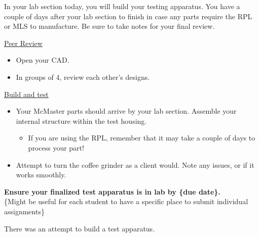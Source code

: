 \documentclass[11pt,letterpaper]{article}
\begin{document}
\MakeHandoutHeader

In your lab section today, you will build your testing apparatus. You have a couple of days after your lab section to finish in case any parts require the RPL or MLS to manufacture. Be sure to take notes for your final review.

\begin{AssignmentSteps}
  \item \underline{Peer Review}
    \begin{itemize}
      \item Open your CAD.
      \item In groups of 4, review each other's designs.
    \end{itemize}
  \item \underline{Build and test}
    \begin{itemize}
      \item Your McMaster parts should arrive by your lab section. Assemble your internal structure within the test housing.
        \begin{itemize}
          \item If you are using the RPL, remember that it may take a couple of days to process your part!
        \end{itemize}
      \item Attempt to turn the coffee grinder as a client would. Note any issues, or if it works smoothly.
    \end{itemize}
\end{AssignmentSteps}
\textbf{Ensure your finalized test apparatus is in lab by \{due date\}.}\\
\{Might be useful for each student to have a specific place to submit individual assignments\}

\newpage
{}
\begin{Checklist}
  \item There was an attempt to build a test apparatus.
\end{Checklist}
\end{document}
